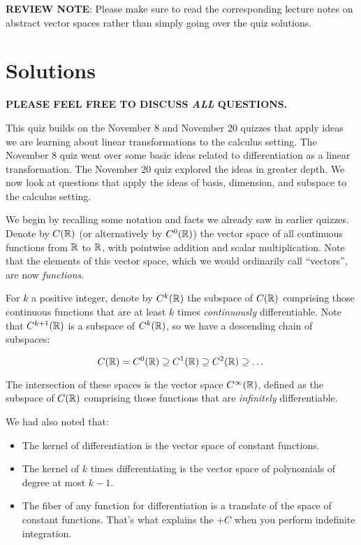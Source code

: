 \documentclass[10pt]{amsart}
\begin{document}
{\bf REVIEW NOTE}: Please make sure to read the corresponding lecture
notes on abstract vector spaces rather than simply going over the quiz
solutions.
\section{Solutions}

{\bf PLEASE FEEL FREE TO DISCUSS {\em ALL} QUESTIONS.}

This quiz builds on the November 8 and November 20 quizzes that apply
ideas we are learning about linear transformations to the calculus
setting. The November 8 quiz went over some basic ideas related to
differentiation as a linear transformation. The November 20 quiz
explored the ideas in greater depth. We now look at questions that
apply the ideas of basis, dimension, and subspace to the calculus
setting.

We begin by recalling some notation and facts we already saw in
earlier quizzes.  Denote by $C(\mathbb{R})$ (or alternatively by $C^0(\mathbb{R})$)
the vector space of all continuous functions from $\mathbb{R}$ to $\mathbb{R}$, with
pointwise addition and scalar multiplication. Note that the elements
of this vector space, which we would ordinarily call ``vectors'', are
now {\em functions}.

For $k$ a positive integer, denote by $C^k(\mathbb{R})$ the subspace of
$C(\mathbb{R})$ comprising those continuous functions that are at least $k$
times {\em continuously} differentiable. Note that $C^{k+1}(\mathbb{R})$ is
a subspace of $C^k(\mathbb{R})$, so we have a descending chain of subspaces:

$$C(\mathbb{R}) = C^0(\mathbb{R}) \supseteq C^1(\mathbb{R}) \supseteq C^2(\mathbb{R}) \supseteq \dots $$

The intersection of these spaces is the vector space $C^\infty(\mathbb{R})$,
defined as the subspace of $C(\mathbb{R})$ comprising those functions that
are {\em infinitely} differentiable.

We had also noted that:

\begin{itemize}
\item The kernel of differentiation is the vector space of constant functions.
\item The kernel of $k$ times differentiating is the vector space of
  polynomials of degree at most $k - 1$.
\item The fiber of any function for differentiation is a translate
  of the space of constant functions. That's what explains the $+C$
  when you perform indefinite integration.
\end{itemize}
\end{document}
